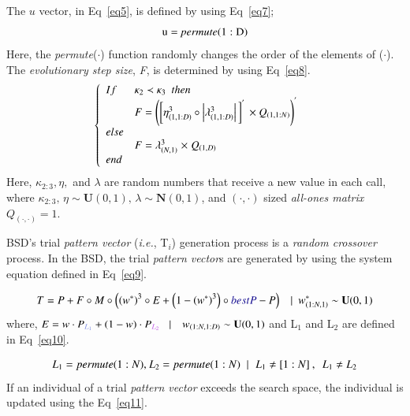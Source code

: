 \documentclass[preprint,10pt,3p]{elsarticle}
\begin{document}
The $u$ vector, in Eq~\ref{eq5}, is defined by using Eq~\ref{eq7};
\begin{equation}\label{eq7}
  {\rm{u = \emph{permute}(1:D)}}
\end{equation}
Here, the \emph{permute}($\cdot$) function randomly changes the order of the elements of ($\cdot$). The \emph{evolutionary step size}, \emph{F}, is determined by using Eq~\ref{eq8}.
\begin{equation}\label{eq8}
 \left\{ {\begin{array}{*{20}{l}}
If&\kappa _2 \prec \kappa _3\,\,\, then&\\
&F = \left( {\left[ {\eta _{(1,1:D)}^3 \circ \left| \lambda _{(1,1:D)}^3 \right|\,} \right]^{'}\,\times {Q_{(1,1:N)}}} \right)^{'}&{}\\
{else}&{}&{}\\
{}&{F = \lambda _{\left( {N,1} \right)}^3{\mkern 1mu}  \times {\mkern 1mu} {Q_{(1,D)}}}&{}\\
{end}&{}&{}
\end{array}} \right.
\end{equation}
Here, $\kappa _{2:3},\eta,$ and $\lambda$ are random numbers that receive a new value in each call, where $\kappa _{2:3},\, \eta \sim \textbf{U}(0,1),\, \lambda \sim \textbf{N}(0,1)$, and ${(\cdot,\cdot)}$ sized \emph{all-ones matrix}  $Q_{(\cdot,\cdot)}=1$.

\textcolor{bluebell}{BSD}'s trial \emph{pattern vector} (\emph{i.e.}, T$_{i}$) generation process is a \emph{random crossover} process. In the \textcolor{bluebell}{BSD}, the trial \emph{pattern vector}s are generated by using the system equation defined in Eq~\ref{eq9}.

\begin{equation}\label{eq9}
T = P + F \circ M \circ \left( {{{\left( {{w^*}} \right)}^3} \circ E + \left( {1 - {{\left( {{w^*}} \right)}^3}} \right) \circ \textcolor{blue} {\textcolor{ultramarine}{bestP}} - P} \right)\,\,\,\,\,|\,\,\,w_{(1:N,1)}^*\sim \textbf{U}(0,1)
\end{equation}
where, $ E = w \cdot {P_{\textcolor[rgb]{0.5,.56,.89} {L_{1}}}} + (1 - w) \cdot {P_{\textcolor[rgb]{0.75,.36,.90}{{L_2}}}}\,\,\,\,\,|\,\,\,\,\,\,{w_{(1:N,1:D)}}\sim \textbf{U}(0,1)$  and  L$_1$ and L$_2$ are defined in Eq~\ref{eq10}.

\begin{equation}\label{eq10}
  {L_1} = permute(1:N),{\mkern 1mu} {\rm{ }}{L_2} = permute(1:N){\mkern 1mu} \,\,\,|{\mkern 1mu} \,\,\,{\mkern 1mu} {L_1} \ne [1:N]{\mkern 1mu} \,,\,\,\,{L_1} \ne {L_2}
\end{equation}
If an individual of a trial \emph{pattern vector} exceeds the search space, the individual is updated using the Eq~\ref{eq11}.
\end{document}

